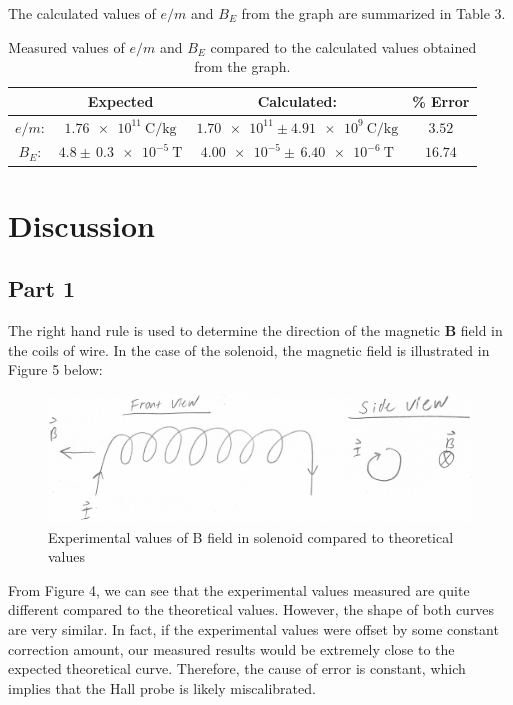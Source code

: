 \documentclass[letterpaper]{article}
\begin{document}
\vspace{1cm}
\noindent The calculated values of $e/m$ and $B_E$ from the graph are summarized in Table 3.
\begin{table}[H]
\centering
\begin{tabular}{c|c|c|c|}
                & Expected                      & Calculated:                                     & \% Error \\ \hline
$e/m$: & $\SI{1.76e11}{\coulomb\per\kilogram}$      & $\num{1.70e11} \pm \SI{4.91e9}{\coulomb\per\kilogram}$  &    $3.52$  \\ \hline
$B_E$: & $4.8 \pm \,\SI{0.3e-5}{\tesla}$           & $\num{4.00e-5} \pm \,\SI{6.40e-6}{\tesla}$                    &   $16.74$  \\ \hline
\end{tabular}
\caption{Measured values of $e/m$ and $B_E$ compared to the calculated values obtained from the graph.}
\end{table}

\section{Discussion}

\subsection{Part 1}

The right hand rule is used to determine the
direction of the magnetic $\textbf{B}$ field in the coils of wire. In the case of the
solenoid, the magnetic field is illustrated in Figure 5 below:

\begin{figure}[H]
    \centering
    \includegraphics[width=\textwidth]{question1.jpg}
    \caption{Experimental values of B field in solenoid compared to theoretical values}
\end{figure}

From Figure 4, we can see that the experimental values measured are quite different
compared to the theoretical values. However, the shape of both curves are very similar.
In fact, if the experimental values were offset by some constant correction amount, our
measured results would be extremely close to the expected theoretical curve. Therefore,
the cause of error is constant, which implies that the Hall probe is likely miscalibrated.
\end{document}
